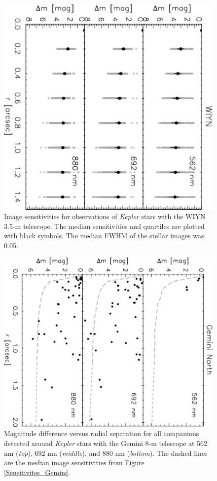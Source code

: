 \documentclass[twocolumn,appendixfloats]{aastex6}
\begin{document}
\begin{figure}[!]
\centering
\includegraphics[angle=90, scale=0.47]{WIYN_speckle_images_sensitivities.pdf}
\caption{Image sensitivities for observations of {\it Kepler} stars with the WIYN 3.5-m 
telescope. The median sensitivities and quartiles are plotted with black symbols.
The median FWHM of the stellar images was 0.05\arcsec.
\label{Sensitivites_WIYN}}
\end{figure}

\begin{figure}[!]
\centering
\includegraphics[angle=90, scale=0.53]{Gemini_speckle_multiples.pdf}
\caption{Magnitude difference versus radial separation for all companions detected
around {\it Kepler} stars with the Gemini 8-m telescope at 562 nm ({\it top}),
692 nm ({\it middle}), and 880 nm ({\it bottom}). The dashed lines are the median
image sensitivities from Figure \ref {Sensitivites_Gemini}.
\label{KOIs_Gemini}}
\end{figure}
\end{document}
